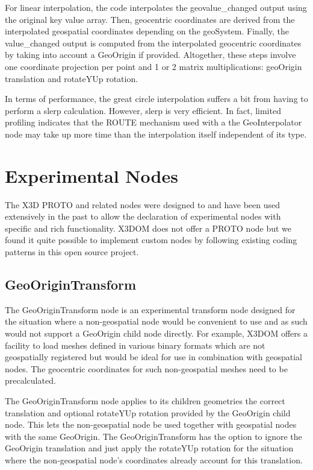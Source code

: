 \documentclass{acmsiggraph}                     %
\begin{document}
For linear interpolation, the code interpolates the geovalue\_changed output using the original key
value array. Then, geocentric coordinates are derived from the interpolated geospatial coordinates
depending on the geoSystem. Finally, the  value\_changed output is computed from the interpolated
geocentric coordinates by taking into account a GeoOrigin if provided. Altogether, these steps
involve one coordinate projection per point and 1 or 2 matrix multiplications: geoOrigin translation
and rotateYUp rotation.

In terms of performance, the great circle interpolation suffers a bit from having to perform a slerp
calculation. However, slerp is very efficient. In fact, limited profiling indicates that the ROUTE
mechanism used with a the GeoInterpolator node may take up more time than the interpolation itself
independent of its type.

\section{Experimental Nodes}

The X3D PROTO and related nodes were designed to and have been used extensively in the past to allow the declaration of experimental nodes with specific and rich functionality. X3DOM does not offer a PROTO node but we found it quite possible to implement custom nodes by following existing coding patterns in this open source project.

\subsection{GeoOriginTransform}

The GeoOriginTransform node is an experimental transform node designed for the situation where 
a non-geospatial node would be convenient to use and as such would not support a GeoOrigin child 
node directly. For example, X3DOM offers a facility to load meshes defined in various binary 
formats which are not geospatially registered but would be ideal for use in combination with 
geospatial nodes. The geocentric coordinates for such non-geospatial meshes need to be 
precalculated.

The GeoOriginTransform node applies to its children geometries the correct translation and optional rotateYUp rotation provided by the GeoOrigin child node. This lets the non-geospatial node be used together with geospatial nodes with the same GeoOrigin. The GeoOriginTransform has the option to ignore the GeoOrigin translation and just apply the rotateYUp rotation for the situation where the non-geospatial node's coordinates already account for this translation.
\end{document}
